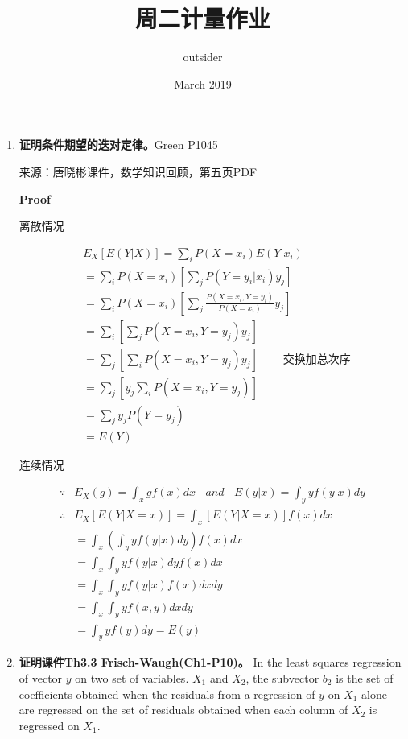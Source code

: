 \documentclass{article}
\title{周二计量作业}
\author{outsider}
\date{March 2019}
\begin{document}
\maketitle

\begin{enumerate}
    \item \textbf{证明条件期望的迭对定律。}Green P1045

    来源：唐晓彬课件，数学知识回顾，第五页PDF

    \textbf{Proof}

    离散情况

    $$
      \begin{aligned}
        & E_X[E(Y|X)] = \sum_{i}P(X=x_i)E(Y|x_i) \\
        & = \sum_iP(X=x_i)[\sum_jP(Y=y_i|x_i)y_j] \\
        & = \sum_iP(X=x_i)[\sum_j\frac{P(X=x_i, Y=y_i)}{P(X=x_i)} y_j] \\
        & = \sum_i[\sum_jP(X=x_i, Y=y_j) y_j] \\
        & = \sum_j[\sum_iP(X=x_i, Y=y_j) y_j] \ \ \ \ \ \ \ \ \ \ \text{交换加总次序}\\
        & = \sum_j[y_j \sum_iP(X=x_i, Y=y_j)] \\
        & = \sum_jy_jP(Y=y_j) \\
        & = E(Y)
      \end{aligned}
    $$

    连续情况

    $$
      \begin{aligned}
        \because & E_X(g) = \int_{x} gf(x)dx\ \ \ \ and \ \ \ \ E(y|x) = \int_yyf(y|x)dy \\
        \therefore & E_X[E(Y|X=x)] = \int_x [E(Y|X=x)]f(x) dx \\
        & = \int_x\left( \int_yyf(y|x)dy \right) f(x)dx \\
        & = \int_x \int_y yf(y|x)dy f(x)dx \\
        & = \int_x \int_y yf(y|x)f(x)dxdy \\
        & = \int_x \int_y yf(x, y)dxdy \\
        & = \int_y yf(y)dy = E(y)
      \end{aligned}
    $$

    \item \textbf{证明课件Th3.3 Frisch-Waugh(Ch1-P10)。} In the least squares regression of vector $y$ on two set of variables. $X_1$ and $X_2$, the subvector $b_2$ is the set of coefficients obtained when the residuals from a regression of $y$ on $X_1$ alone are regressed on the set of residuals obtained when each column of $X_2$ is regressed on $X_1$.


\end{enumerate}
\end{document}
